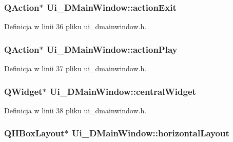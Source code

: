 \subsubsection[{action\+Exit}]{\setlength{\rightskip}{0pt plus 5cm}Q\+Action$\ast$ Ui\+\_\+\+D\+Main\+Window\+::action\+Exit}\label{class_ui___d_main_window_ae1fa62a4d27fa0f4a5c63c7c60cfdad2}


Definicja w linii 36 pliku ui\+\_\+dmainwindow.\+h.

\hypertarget{class_ui___d_main_window_a6cfb6311ca1dd6e247d80255e2667ba7}{}
\subsubsection[{action\+Play}]{\setlength{\rightskip}{0pt plus 5cm}Q\+Action$\ast$ Ui\+\_\+\+D\+Main\+Window\+::action\+Play}\label{class_ui___d_main_window_a6cfb6311ca1dd6e247d80255e2667ba7}


Definicja w linii 37 pliku ui\+\_\+dmainwindow.\+h.

\hypertarget{class_ui___d_main_window_a94cf40cb4e645cfa2e80f36ffbf5018e}{}
\subsubsection[{central\+Widget}]{\setlength{\rightskip}{0pt plus 5cm}Q\+Widget$\ast$ Ui\+\_\+\+D\+Main\+Window\+::central\+Widget}\label{class_ui___d_main_window_a94cf40cb4e645cfa2e80f36ffbf5018e}


Definicja w linii 38 pliku ui\+\_\+dmainwindow.\+h.

\hypertarget{class_ui___d_main_window_a4ab6ff85d8c5edef531b3f2111a04157}{}
\subsubsection[{horizontal\+Layout}]{\setlength{\rightskip}{0pt plus 5cm}Q\+H\+Box\+Layout$\ast$ Ui\+\_\+\+D\+Main\+Window\+::horizontal\+Layout}\label{class_ui___d_main_window_a4ab6ff85d8c5edef531b3f2111a04157}


